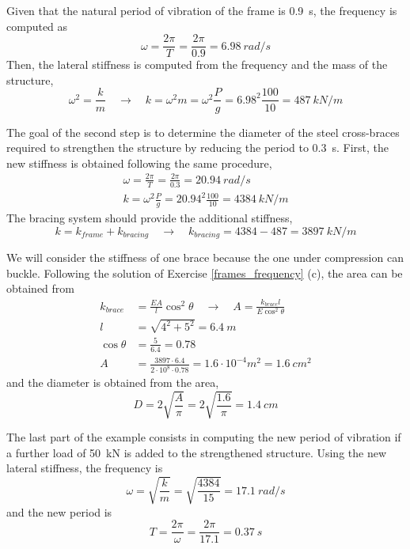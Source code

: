 \begin{Answer}[ref={frames_modification}]
Given that the natural period of vibration of the frame is \SI{0.9}{s}, the frequency is computed as
$$
\omega = \frac{2\pi}{T} = \frac{2\pi}{0.9} = \SI{6.98}{rad/s}
$$
Then, the lateral stiffness is computed from the frequency and the mass of the structure,
$$
\omega^2 = \frac{k}{m} \quad \rightarrow \quad
k = \omega^2m = \omega^2\frac{P}{g} = 6.98^2\frac{100}{10} = \SI{487}{kN/m}
$$

The goal of the second step is to determine the diameter of the steel cross-braces required to strengthen the structure by reducing the period to \SI{0.3}{s}. First, the new stiffness is obtained following the same procedure,
\begin{align*}
\omega = \frac{2\pi}{T} = \frac{2\pi}{0.3} = \SI{20.94}{rad/s} \\
k = \omega^2\frac{P}{g} = 20.94^2\frac{100}{10} = \SI{4384}{kN/m}
\end{align*}
The bracing system should provide the additional stiffness,
$$
k = k_{frame} + k_{bracing} \quad \rightarrow \quad k_{bracing} = 4384 - 487 = \SI{3897}{kN/m}
$$

We will consider the stiffness of one brace because the one under compression can buckle. 
Following the solution of Exercise \ref{frames_frequency} (c), the area can be obtained from
\begin{align*}
k_{brace} &= \frac{EA}{l}\cos^2\theta \quad \rightarrow \quad A = \frac{k_{brace}l}{E\cos^2\theta} \\
l &= \sqrt{4^2 + 5^2} = \SI{6.4}{m} \\
\cos\theta &= \frac{5}{6.4} = 0.78 \\
A &= \frac{3897\cdot 6.4}{2\cdot 10^8\cdot 0.78} = 1.6\cdot 10^{-4} m^2 = \SI{1.6}{cm^2}
\end{align*}
and the diameter is obtained from the area,
$$
D = 2\sqrt{\frac{A}{\pi}} = 2\sqrt{\frac{1.6}{\pi}} = \SI{1.4}{cm}
$$

The last part of the example consists in computing the new period of vibration if a further load of \SI{50}{kN} is added to the strengthened structure. Using the new lateral stiffness, the frequency is
$$
\omega = \sqrt{\frac{k}{m}} = \sqrt{\frac{4384}{15}} = \SI{17.1}{rad/s}
$$
and the new period is
$$
T = \frac{2\pi}{\omega} = \frac{2\pi}{17.1} = \SI{0.37}{s}
$$

\end{Answer}

